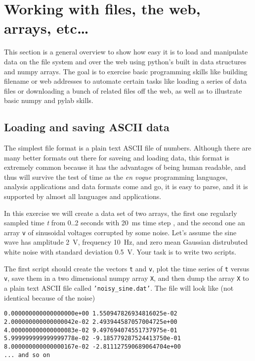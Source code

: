 \section{Working with files, the web, arrays, etc\dots}
\label{sec:working_with_files}

This section is a general overview to show how easy it is to load
and manipulate data on the file system and over the web using python's
built in data structures and numpy arrays.  The goal is to exercise
basic programming skills like building filename or web addresses to
automate certain tasks like loading a series of data files or
downloading a bunch of related files off the web, as well as to
illustrate basic numpy and pylab skills.

\subsection{Loading and saving ASCII data}
\label{sec:ascii_data}

The simplest file format is a plain text ASCII file of numbers.
Although there are many better formats out there for saveing and
loading data, this format is extremely common because it has the
advantages of being human readable, and thus will survive the test of
time as the \textit{en vogue} programming languages, analysis
applications and data formats come and go, it is easy to parse, and it
is supported by almost all languages and applications.  

In this exercise we will create a data set of two arrays, the first
one regularly sampled time \textit{t} from 0..2 seconds with 20~ms
time step , and the second one an array \texttt{v} of sinusoidal
voltages corrupted by some noise.  Let's assume the sine wave has
amplitude 2~V, frequency 10~Hz, and zero mean Gaussian distrubuted
white noise with standard deviation 0.5~V.  Your task is to write two
scripts.

The first script should create the vectors \texttt{t} and \texttt{v},
plot the time series of \texttt{t} versus \texttt{v}, save them in a
two dimensional numpy array \texttt{X}, and then dump the array
\texttt{X} to a plain text ASCII file called
\texttt{'noisy_sine.dat'}.  The file will look like (not identical
because of the noise)

\begin{verbatim}
0.000000000000000000e+00 1.550947826934816025e-02
2.000000000000000042e-02 2.493944587057004725e+00
4.000000000000000083e-02 9.497694074551737975e-01
5.999999999999999778e-02 -9.185779287524413750e-01
8.000000000000000167e-02 -2.811127590689064704e+00
... and so on
\end{verbatim}

